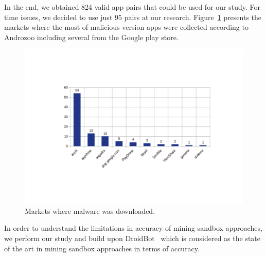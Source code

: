 In the end, we obtained 824 valid app pairs that could be used for our study. For time issues, we decided to use just 95  pairs at our research. Figure~\ref{fig:stores} presents the markets where the most of malicious version apps were collected according to Androzoo including several from the Google play store.


\begin{figure}[ht]
\centering
\includegraphics[scale=0.3]{images/stores.pdf}
\caption{Markets where malware was downloaded.}
 \label{fig:stores}
\end{figure}

In order to understand the limitations in accuracy of mining sandbox approaches, we perform our study and build upon DroidBot~\cite{DBLP:conf/icse/LiYGC17} which is considered as the state of the art in mining sandbox approaches in terms of accuracy. 

